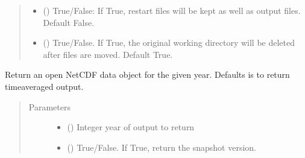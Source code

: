 \documentclass[letterpaper,10pt,english]{sphinxmanual}
\begin{document}
\begin{fulllineitems}
\begin{fulllineitems}
\begin{quote}
\begin{description}
\begin{itemize}
\item {} 
 (\sphinxstyleliteralemphasis{\sphinxupquote{, }}) \textendash{} True/False: If True, restart files will be kept as well as output files.
Default False.

\item {} 
 (\sphinxstyleliteralemphasis{\sphinxupquote{, }}) \textendash{} True/False. If True, the original working directory will be deleted after files
are moved. Default True.

\end{itemize}

\end{description}\end{quote}

\end{fulllineitems}


\begin{fulllineitems}
\label{\detokenize{source/exoplasim:exoplasim.Model.get}}
Return an open NetCDF data object for the given year. Defaults is to return time\sphinxhyphen{}averaged output.
\begin{quote}\begin{description}
\item[{Parameters}] \leavevmode\begin{itemize}
\item {} 
 () \textendash{} Integer year of output to return

\item {} 
 (\sphinxstyleliteralemphasis{\sphinxupquote{, }}) \textendash{} True/False. If True, return the snapshot version.


\end{itemize}
\end{description}
\end{quote}
\end{fulllineitems}
\end{fulllineitems}
\end{document}
